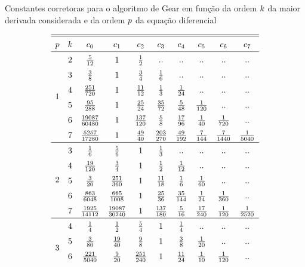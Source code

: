 \begin{table}[h]
	\caption{Constantes corretoras para o algoritmo de Gear em função da ordem \(k\) da maior derivada considerada e da ordem \(p\) da equação diferencial}
	\label{table:corrector_constants}

	\begin{equation*}
		\def\arraystretch{1.5}
		\begin{array}{cccccccccc}
	\hline
	\hline
		\eqOrder & \taylorOrder & c_0 & c_1 & c_2 & c_3 & c_4 & c_5 & c_6 & c_7 \\
	\hline
		\multirow{6}{*}{1} 
		& 2 & \frac{5}{12} & 1 & \frac{1}{2} & .. & .. & .. & .. & .. \\
		& 3 & \frac{3}{8} & 1 & \frac{3}{4} & \frac{1}{6} & .. & .. & .. & .. \\
		& 4 & \frac{251}{720} & 1 & \frac{11}{12} & \frac{1}{3} & \frac{1}{24} & .. & .. & .. \\
		& 5 & \frac{95}{288} & 1 & \frac{25}{24} & \frac{35}{72} & \frac{5}{48} & \frac{1}{120} & .. & .. \\
		& 6 & \frac{19087}{60480} & 1 & \frac{137}{120} & \frac{5}{8} & \frac{17}{96} & \frac{1}{40} & \frac{1}{720} & .. \\
		& 7 & \frac{5257}{17280} & 1 & \frac{49}{40} & \frac{203}{270} & \frac{49}{192} & \frac{7}{144} & \frac{7}{1440} & \frac{1}{5040} \\
	\hline
		\multirow{5}{*}{2} 
		& 3 & \frac{1}{6} & \frac{5}{6} & 1 & \frac{1}{3} & .. & .. & .. & .. \\
		& 4 & \frac{19}{120} & \frac{3}{4} & 1 & \frac{1}{2} & \frac{1}{12} & .. & .. & .. \\
		& 5 & \frac{3}{20} & \frac{251}{360} & 1 & \frac{11}{18} & \frac{1}{6} & \frac{1}{60} & .. & .. \\
		& 6 & \frac{863}{6048} & \frac{665}{1008} & 1 & \frac{25}{36} & \frac{35}{144} & \frac{1}{24} & \frac{1}{360} & .. \\
		& 7 & \frac{1925}{14112} & \frac{19087}{30240} & 1 & \frac{137}{180} & \frac{5}{16} & \frac{17}{240} & \frac{1}{120} & \frac{1}{2520} \\
	\hline
		\multirow{4}{*}{3} 
		& 4 & \frac{1}{4} & \frac{1}{2} & \frac{5}{4} & 1 & \frac{1}{4} & .. & .. & .. \\
		& 5 & \frac{3}{80} & \frac{19}{40} & \frac{9}{8} & 1 & \frac{3}{8} & \frac{1}{20} & .. & .. \\
		& 6 & \frac{221}{5040} & \frac{9}{20} & \frac{251}{240} & 1 & \frac{11}{24} & \frac{1}{10} & \frac{1}{120} & .. \\

\end{array}
\end{equation*}
\end{table}
